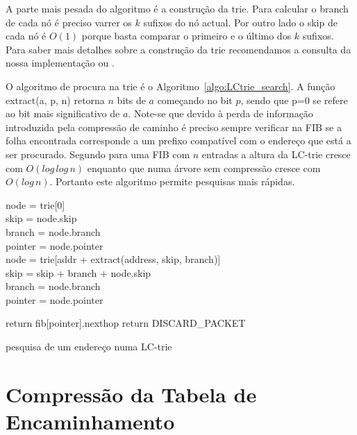 \documentclass[10pt,a4paper]{article}
\begin{document}
A parte mais pesada do algoritmo é a construção da trie. Para calcular o branch de cada nó é preciso varrer os $k$ sufixos do nó actual. Por outro lado o skip de cada nó é $O(1)$ porque basta comparar o primeiro e o último dos $k$ sufixos. Para saber mais detalhes sobre a construção da trie recomendamos a consulta da nossa implementação ou \cite{SNilsson99}.

O algoritmo de procura na trie é o Algoritmo~\ref{algo:LCtrie_search}. A função extract(a, p, n) retorna $n$ bits de $a$ começando no bit $p$, sendo que p=0 se refere ao bit mais significativo de $a$. Note-se que devido à perda de informação introduzida pela compressão de caminho é preciso sempre verificar na FIB se a folha encontrada corresponde a um prefixo compatível com o endereço que está a ser procurado. Segundo \cite{SNilsson99} para uma FIB com $n$ entradas a altura da \mbox{LC-trie} cresce com $O(log \, log \, n)$ enquanto que numa árvore sem compressão cresce com $O(log \, n)$. Portanto este algoritmo permite pesquisas mais rápidas.

\begin{algorithm}
	\label{algo:LCtrie_search}

	node = trie[0] \\
	skip = node.skip \\
	branch = node.branch \\
	pointer = node.pointer \\
	{
		node = trie[addr + extract(address, skip, branch)] \\
		skip = skip + branch + node.skip \\
		branch = node.branch \\
		pointer = node.pointer \\
	}
	
	{
		return fib[pointer].nexthop
	}
	\Else
	{
		return DISCARD\_PACKET
	}
		\begin{comment}
			node = trie[0]
			skip = node.skip
			branch = node.branch
			pointer = node.pointer
			
			while( branch != 0 )
			{
				node = trie[addr + extract(address, skip, branch)]
				skip = skip + branch + node.skip
				branch = node.branch
				pointer = node.pointer
			}
			
			if( address starts with fib[pointer].prefix )
				return fib[pointer].nexthop
			else
				return DISCARD_PACKET \\
		\end{comment}
	\caption{pesquisa de um endereço numa LC-trie}
\end{algorithm}

\section{Compressão da Tabela de Encaminhamento}

	
	
\end{document}
